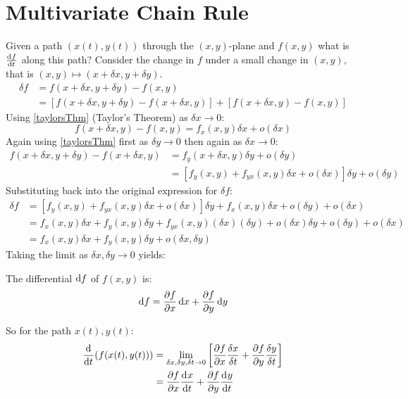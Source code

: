 \documentclass[../main.tex]{subfiles}
\begin{document}
\section{Multivariate Chain Rule}
\label{multivariateChainRule}
Given a path $(x(t), y(t))$ through the $(x, y)$-plane and $f(x, y)$ what is $\deriv{f}{t}$ along this path?
Consider the change in $f$ under a small change in $(x, y)$, that is $(x, y) \mapsto (x + \delta x, y + \delta y)$.
\begin{align*}
  \delta f &= f(x + \delta x, y + \delta y) - f(x, y) \\
           &= [f(x + \delta x, y + \delta y) - f(x + \delta x, y)] + [f(x + \delta x, y) - f(x, y)]
\end{align*}
Using \cref{taylorsThm} (Taylor's Theorem) as $\delta x \to 0$:
\[
  f(x + \delta x, y) - f(x, y) = f_x(x, y) \delta x + o(\delta x)
\]
Again using \cref{taylorsThm} first as $\delta y \to 0$ then again as $\delta x \to 0$:
\begin{align*}
  f(x + \delta x, y + \delta y) - f(x + \delta x, y) &= f_y(x + \delta x, y)\delta y + o(\delta y) \\
                                                     &= [f_y(x, y) + f_{yx}(x, y)\delta x + o(\delta x)] \delta y + o(\delta y)
\end{align*}
Substituting back into the original expression for $\delta f$:
\begin{align*}
  \delta f &= [f_y(x, y) + f_{yx}(x,y)\delta x + o(\delta x)]\delta y + f_x(x, y)\delta x + o(\delta y) + o(\delta x) \\
           &= f_x(x, y)\delta x + f_y(x, y)\delta y + f_{yx}(x, y)(\delta x)(\delta y) + o(\delta x)\delta y + o(\delta y) + o(\delta x) \\
           &= f_x(x, y)\delta x + f_y(x, y)\delta y + o(\delta x, \delta y)
\end{align*}
Taking the limit as $\delta x, \delta y \to 0$ yields:
\begin{theorem}
  The differential $\d{f}$ of $f(x, y)$ is:
  \[
    \d{f} = \pderiv{f}{x}\d{x} + \pderiv{f}{y}\d{y}
  \]
\end{theorem}
So for the path $x(t), y(t)$:
\begin{align*}
  \deriv{}{t}(f(x(t), y(t))) &= \lim_{\delta x, \delta y, \delta t \to 0} \left[\pderiv{f}{x} \frac{\delta x}{\delta t} + \pderiv{f}{y} \frac{\delta y}{\delta t}\right] \\
  &= \pderiv{f}{x} \deriv{x}{t} + \pderiv{f}{y} \deriv{y}{t}
\end{align*}
\end{document}
